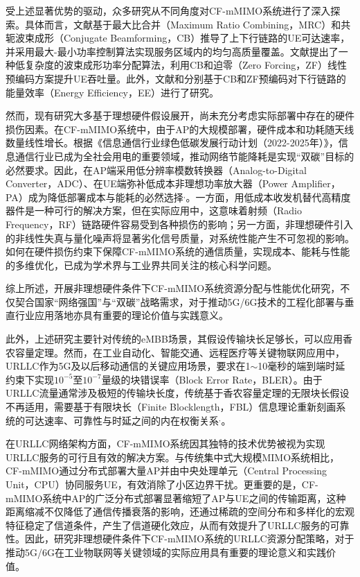 受上述显著优势的驱动，众多研究从不同角度对CF-mMIMO系统进行了深入探索。具体而言，文献\textcite{chapterone6}基于最大比合并（Maximum Ratio Combining，MRC）和共轭波束成形（Conjugate Beamforming，CB）推导了上下行链路的UE可达速率，并采用最大-最小功率控制算法实现服务区域内的均匀高质量覆盖。文献\textcite{chapterone11}提出了一种低复杂度的波束成形功率分配算法，利用CB和迫零（Zero Forcing，ZF）线性预编码方案提升UE吞吐量。此外，文献\textcite{chapterone10}和\textcite{chapterone12}分别基于CB和ZF预编码对下行链路的能量效率（Energy Efficiency，EE）进行了研究。

然而，现有研究大多基于理想硬件假设展开，尚未充分考虑实际部署中存在的硬件损伤因素。在CF-mMIMO系统中，由于AP的大规模部署，硬件成本和功耗随天线数量线性增长\cite{chapterone13}。根据《信息通信行业绿色低碳发展行动计划（2022-2025年）》\cite{chapterone14}，信息通信行业已成为全社会用电的重要领域，推动网络节能降耗是实现“双碳”目标的必然要求。因此，在AP端采用低分辨率模数转换器（Analog-to-Digital Converter，ADC）、在UE端弥补低成本非理想功率放大器（Power Amplifier，PA）成为降低部署成本与能耗的必然选择\cite{chapterone15}$^,$\cite{chapterone16}。一方面，用低成本收发机替代高精度器件是一种可行的解决方案\cite{chapterone17}，但在实际应用中，这意味着射频（Radio Frequency，RF）链路硬件容易受到各种损伤的影响；另一方面，非理想硬件引入的非线性失真与量化噪声将显著劣化信号质量，对系统性能产生不可忽视的影响。如何在硬件损伤约束下保障CF-mMIMO系统的通信质量，实现成本、能耗与性能的多维优化，已成为学术界与工业界共同关注的核心科学问题。

综上所述，开展非理想硬件条件下CF-mMIMO系统资源分配与性能优化研究，不仅契合国家“网络强国”与“双碳”战略需求，对于推动5G/6G技术的工程化部署与垂直行业应用落地亦具有重要的理论价值与实践意义。

此外，上述研究主要针对传统的eMBB场景，其假设传输块长足够长，可以应用香农容量定理。然而，在工业自动化、智能交通、远程医疗等关键物联网应用中，URLLC作为5G及以后移动通信的关键应用场景，要求在1$\sim $10毫秒的端到端时延约束下实现$10^{-5}$至$10^{-7}$量级的块错误率（Block Error Rate，BLER）\cite{paper1}。由于URLLC流量通常涉及极短的传输块长度，传统基于香农容量定理的无限块长假设不再适用，需要基于有限块长（Finite Blocklength，FBL）信息理论重新刻画系统的可达速率、可靠性与时延之间的内在权衡关系\cite{paper2}$^,$\cite{paper3}。

在URLLC网络架构方面，CF-mMIMO系统因其独特的技术优势被视为实现URLLC服务的可行且有效的解决方案\cite{paper4}。与传统集中式大规模MIMO系统相比，CF-mMIMO通过分布式部署大量AP并由中央处理单元（Central Processing Unit，CPU）协同服务UE，有效消除了小区边界干扰。更重要的是，CF-mMIMO系统中AP的广泛分布式部署显著缩短了AP与UE之间的传输距离，这种距离缩减不仅降低了通信传播衰落的影响，还通过稀疏的空间分布和多样化的宏观特征稳定了信道条件，产生了信道硬化效应，从而有效提升了URLLC服务的可靠性\cite{paper5}。因此，研究非理想硬件条件下CF-mMIMO系统的URLLC资源分配策略，对于推动5G/6G在工业物联网等关键领域的实际应用具有重要的理论意义和实践价值。

